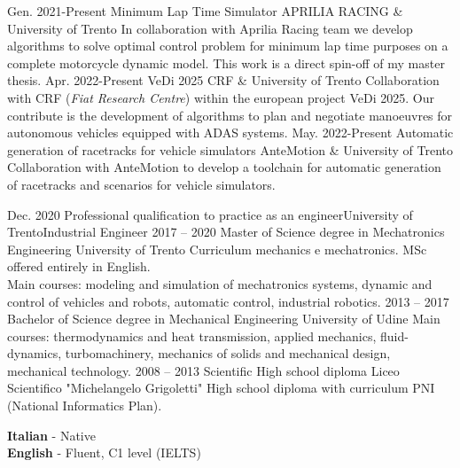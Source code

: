 \documentclass[9pt]{developercv_mattia} %
\begin{document}
%
%
%
%
\begin{entrylist}
	\entry
		{Gen. 2021-Present}
		{Minimum Lap Time Simulator}
		{APRILIA RACING \& University of Trento}
		{In collaboration with Aprilia Racing team we develop algorithms to solve optimal control problem for minimum lap time purposes on a complete motorcycle dynamic model. This work is a direct spin-off of my master thesis.}
	\entry
		{Apr. 2022-Present}
		{VeDi 2025}
		{CRF \& University of Trento}
		{Collaboration with CRF (\textit{Fiat Research Centre}) within the european project VeDi 2025. Our contribute is the development of algorithms to plan and negotiate manoeuvres for autonomous vehicles equipped with ADAS systems. }
	\entry
		{May. 2022-Present}
		{Automatic generation of racetracks for vehicle simulators}
		{AnteMotion \& University of Trento}
		{Collaboration with AnteMotion to develop a toolchain for automatic generation of racetracks and scenarios for vehicle simulators. }
\end{entrylist}
%
\pagebreak
%
%
%
\begin{entrylist}
	\entry
		{Dec. 2020}
		{Professional qualification to practice as an engineer}{University of Trento}{Industrial Engineer}
	\entry
		{2017 -- 2020}
		{Master of Science degree in Mechatronics Engineering}
		{University of Trento}
		{Curriculum mechanics e mechatronics. MSc offered entirely in English.\\
		Main courses: modeling and simulation of mechatronics systems, dynamic and control of vehicles and robots, automatic control, industrial robotics.}
	\entry
		{2013 -- 2017}
		{Bachelor of Science degree in Mechanical Engineering}
		{University of Udine}
		{Main courses: thermodynamics and heat transmission, applied mechanics, fluid-dynamics, turbomachinery, mechanics of solids and mechanical design, mechanical technology.} %
	\entry
		{2008 -- 2013}
		{Scientific High school diploma}
		{Liceo Scientifico "Michelangelo Grigoletti"}
		{High school diploma with curriculum PNI (National Informatics Plan). } %
\end{entrylist}
%
%
\begin{minipage}[t]{0.27\textwidth}
	\vspace{-\baselineskip} %
%
	\textbf{Italian} - Native\\
	\textbf{English}  - Fluent, C1 level (IELTS)
%
\end{minipage}
\end{document}
